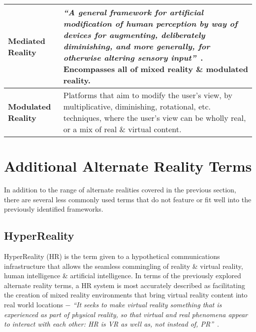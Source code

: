 \begin{center}
\begin{longtable}{| l | p{10cm} |}
\hline


\textbf{Mediated Reality} & \textit{``A general framework for artificial modification of human perception by way of devices for augmenting, deliberately diminishing, and more generally, for otherwise altering sensory input''}~\cite{Mann2002a}. Encompasses all of mixed reality \& modulated reality. \\

\hline


\textbf{Modulated Reality} & Platforms that aim to modify the user's view, by multiplicative, diminishing, rotational, etc. techniques, where the user's view can be wholly real, or a mix of real \& virtual content. \\

\hline

\end{longtable}
\end{center}


\section{Additional Alternate Reality Terms}

In addition to the range of alternate realities covered in the previous section, there are several less commonly used terms that do not feature or fit well into the previously identified frameworks.


\subsection{HyperReality}
\label{subsec_HyperReality}

HyperReality (HR) is the term given to a hypothetical communications infrastructure that allows the seamless commingling of reality \& virtual reality, human intelligence \& artificial intelligence. In terms of the previously explored alternate reality terms, a HR system is most accurately described as facilitating the creation of mixed reality environments that bring virtual reality content into real world locations $-$ \textit{``It seeks to make virtual reality something that is experienced as part of physical reality, so that virtual and real phenomena appear to interact with each other: HR is VR as well as, not instead of, PR''}~\cite{Terashima2001}.

